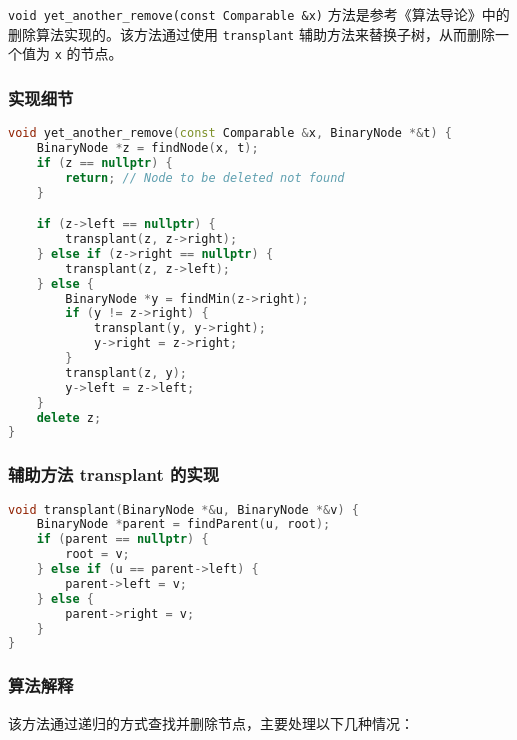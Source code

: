 \documentclass[UTF8]{ctexart}
\begin{document}
\verb|void yet_another_remove(const Comparable &x)| 方法是参考《算法导论》中的删除算法实现的。该方法通过使用 \verb|transplant| 辅助方法来替换子树，从而删除一个值为 \verb|x| 的节点。

\subsubsection{实现细节}

\begin{lstlisting}[language=C++, caption=yet\_another\_remove 方法的实现]
void yet_another_remove(const Comparable &x, BinaryNode *&t) {
    BinaryNode *z = findNode(x, t);
    if (z == nullptr) {
        return; // Node to be deleted not found
    }

    if (z->left == nullptr) {
        transplant(z, z->right);
    } else if (z->right == nullptr) {
        transplant(z, z->left);
    } else {
        BinaryNode *y = findMin(z->right);
        if (y != z->right) {
            transplant(y, y->right);
            y->right = z->right;
        }
        transplant(z, y);
        y->left = z->left;
    }
    delete z;
}
\end{lstlisting}

\subsubsection{辅助方法 transplant 的实现}

\begin{lstlisting}[language=C++, caption=transplant 方法的实现]
void transplant(BinaryNode *&u, BinaryNode *&v) {
    BinaryNode *parent = findParent(u, root);
    if (parent == nullptr) {
        root = v;
    } else if (u == parent->left) {
        parent->left = v;
    } else {
        parent->right = v;
    }
}
\end{lstlisting}

\subsubsection{算法解释}

该方法通过递归的方式查找并删除节点，主要处理以下几种情况：
\end{document}
